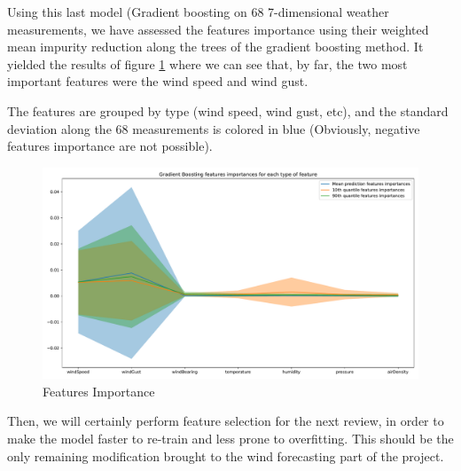 \documentclass[a4paper, 12pt]{article}
\begin{document}
Using this last model (Gradient boosting on 68 7-dimensional weather measurements, we have assessed the features importance using their weighted mean impurity reduction along the trees of the gradient boosting method. It yielded the results of figure \ref{fig:featimp} where we can see that, by far, the two most important features were the wind speed and wind gust.

The features are grouped by type (wind speed, wind gust, etc), and the standard deviation along the 68 measurements is colored in blue (Obviously, negative features importance are not possible).

\begin{figure}[H]
    \centering
    \includegraphics[width=\textwidth]{resources/pdf/fi.pdf}
    \caption{Features Importance}
    \label{fig:featimp}
\end{figure}

Then, we will certainly perform feature selection for the next review, in order to make the model faster to re-train and less prone to overfitting. This should be the only remaining modification brought to the wind forecasting part of the project.
	
\end{document}
